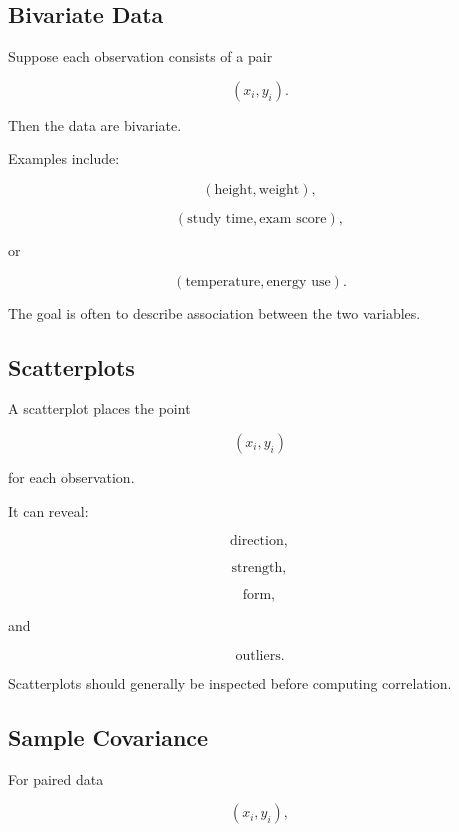 \subsection{Bivariate Data}
\label{subsec:bivariate-data}

Suppose each observation consists of a pair

\[
(x_i,y_i).
\]

Then the data are bivariate.

Examples include:

\[
(\text{height},\text{weight}),
\]

\[
(\text{study time},\text{exam score}),
\]

or

\[
(\text{temperature},\text{energy use}).
\]

The goal is often to describe association between the two variables.

\subsection{Scatterplots}
\label{subsec:scatterplots}

A scatterplot places the point

\[
(x_i,y_i)
\]

for each observation.

It can reveal:

\[
\boxed{
\text{direction},
}
\]

\[
\boxed{
\text{strength},
}
\]

\[
\boxed{
\text{form},
}
\]

and

\[
\boxed{
\text{outliers}.
}
\]

Scatterplots should generally be inspected before computing correlation.

\subsection{Sample Covariance}
\label{subsec:sample-covariance-statistics}

For paired data

\[
(x_i,y_i),
\]

